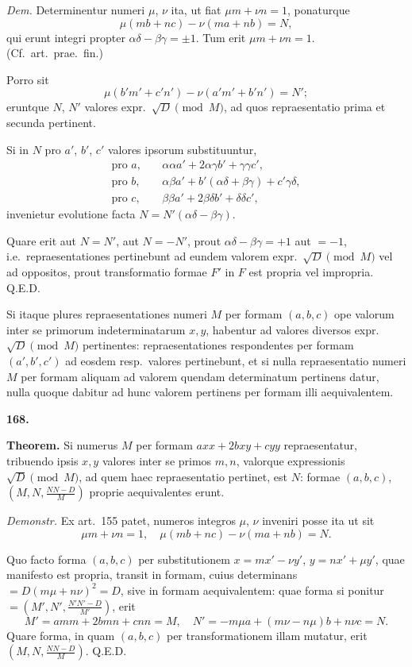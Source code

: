 \documentclass[12pt,a4paper]{article}
\theoremstyle{plain}
\begin{document}
\textit{Dem.} Determinentur numeri $\mu$, $\nu$ ita, ut fiat $\mu m + \nu n = 1$, ponaturque
\[
\mu(mb+nc) - \nu(ma+nb) = N,
\]
qui erunt integri propter $\alpha\delta - \beta\gamma = \pm 1$. Tum erit $\mu m + \nu n = 1$. (Cf.~art.~prae.~fin.)

Porro sit
\[
\mu(b'm' + c'n') - \nu(a'm' + b'n') = N';
\]
eruntque $N$, $N'$ valores expr.~$\sqrt{D} \pmod{M}$, ad quos repraesentatio prima et secunda pertinent.

Si in $N$ pro $a'$, $b'$, $c'$ valores ipsorum substituuntur,
\begin{align*}
\text{pro } a, \quad & \alpha\alpha a' + 2\alpha\gamma b' + \gamma\gamma c',\\
\text{pro } b, \quad & \alpha\beta a' + b'(\alpha\delta + \beta\gamma) + c'\gamma\delta,\\
\text{pro } c, \quad & \beta\beta a' + 2\beta\delta b' + \delta\delta c',
\end{align*}
invenietur evolutione facta $N = N'(\alpha\delta - \beta\gamma)$.

Quare erit aut $N = N'$, aut $N = -N'$, prout $\alpha\delta - \beta\gamma = +1$ aut $=-1$, i.e.~repraesentationes pertinebunt ad eundem valorem expr.~$\sqrt{D} \pmod{M}$ vel ad oppositos, prout transformatio formae $F'$ in $F$ est propria vel impropria. \hfill Q.E.D.

Si itaque plures repraesentationes numeri $M$ per formam $(a,b,c)$ ope valorum inter se primorum indeterminatarum $x,y$, habentur ad valores diversos expr.~$\sqrt{D} \pmod{M}$ pertinentes: repraesentationes respondentes per formam $(a',b',c')$ ad eosdem resp.~valores pertinebunt, et si nulla repraesentatio numeri $M$ per formam aliquam ad valorem quendam determinatum pertinens datur, nulla quoque dabitur ad hunc valorem pertinens per formam illi aequivalentem.

\bigskip

\textbf{168.}

\textbf{Theorem.} Si numerus $M$ per formam $axx + 2bxy + cyy$ repraesentatur, tribuendo ipsis $x,y$ valores inter se primos $m,n$, valorque expressionis $\sqrt{D} \pmod{M}$, ad quem haec repraesentatio pertinet, est $N$: formae $(a,b,c)$, $(M,N,\frac{NN-D}{M})$ proprie aequivalentes erunt.

\textit{Demonstr.} Ex art.~155 patet, numeros integros $\mu$, $\nu$ inveniri posse ita ut sit
\[
\mu m + \nu n = 1, \quad \mu(mb+nc) - \nu(ma+nb) = N.
\]

Quo facto forma $(a,b,c)$ per substitutionem $x = mx' - \nu y'$, $y = nx' + \mu y'$, quae manifesto est propria, transit in formam, cuius determinans $= D(m\mu + n\nu)^2 = D$, sive in formam aequivalentem: quae forma si ponitur $= (M', N', \frac{N'N'-D}{M'})$, erit
\[
M' = amm + 2bmn + cnn = M, \quad N' = -m\mu a + (m\nu - n\mu)b + n\nu c = N.
\]
Quare forma, in quam $(a,b,c)$ per transformationem illam mutatur, erit $(M,N,\frac{NN-D}{M})$. \hfill Q.E.D.
\end{document}
